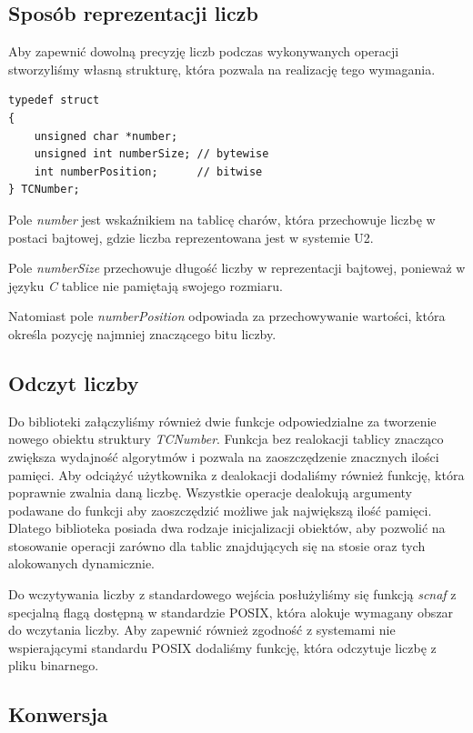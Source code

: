 \documentclass{article}
\begin{document}
\subsection{Sposób reprezentacji liczb}

Aby zapewnić dowolną precyzję liczb podczas wykonywanych operacji stworzyliśmy własną strukturę, która pozwala na realizację tego wymagania.

\begin{verbatim}
typedef struct
{
    unsigned char *number;
    unsigned int numberSize; // bytewise
    int numberPosition;      // bitwise
} TCNumber;
\end{verbatim}

Pole \textit{number} jest wskaźnikiem na tablicę charów, która przechowuje liczbę w postaci bajtowej, gdzie liczba reprezentowana jest w systemie U2.

Pole \textit{numberSize} przechowuje długość liczby w reprezentacji bajtowej, ponieważ w języku \textit{C} tablice nie pamiętają swojego rozmiaru.

Natomiast pole \textit{numberPosition} odpowiada za przechowywanie wartości, która określa pozycję najmniej znaczącego bitu liczby.

\clearpage

\subsection{Odczyt liczby}

Do biblioteki załączyliśmy również dwie funkcje odpowiedzialne za tworzenie nowego obiektu struktury \textit{TCNumber}. Funkcja bez realokacji tablicy znacząco zwiększa wydajność algorytmów  i pozwala na zaoszczędzenie znacznych ilości pamięci. Aby odciążyć użytkownika z dealokacji dodaliśmy również funkcję, która poprawnie zwalnia daną liczbę. Wszystkie operacje dealokują argumenty podawane do funkcji aby zaoszczędzić możliwe jak największą ilość pamięci. Dlatego biblioteka posiada dwa rodzaje inicjalizacji obiektów, aby pozwolić na stosowanie operacji zarówno dla tablic znajdujących się na stosie oraz tych alokowanych dynamicznie.

Do wczytywania liczby z standardowego wejścia posłużyliśmy się funkcją \textit{scnaf} z specjalną flagą dostępną w standardzie POSIX, która alokuje wymagany obszar do wczytania liczby. Aby zapewnić również zgodność z systemami nie wspierającymi standardu POSIX dodaliśmy funkcję, która odczytuje liczbę z pliku binarnego.

\subsection{Konwersja}
\end{document}

